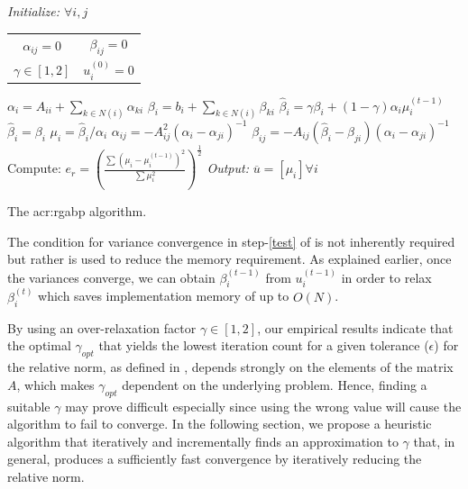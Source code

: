 \begin{algorithm}[h]
	\centering
	\begin{algorithmic}[1]
		\STATE \textit{Initialize: $\forall i,j$}\\
		\begin{tabular}{cc}
			$\alpha_{ij} = 0$ & $ \beta_{ij} = 0$\\ 
			$\gamma \in [1,2]$ & $u_i^{(0)} = 0$
		\end{tabular}
		\REPEAT[Start \gls{acr:pwgabp} iteration: $t=1,2,\cdots$]
		\STATE $\alpha_{i} = A_{ii} + \sum_{k \in N(i)} \alpha_{ki}$
		\STATE $\beta_{i} = b_{i} + \sum_{k \in N(i)} \beta_{ki}$
		\label{test}
		\STATE $\hat\beta_i = \gamma\beta_i + (1-\gamma)\alpha_i \mu_i^{(t-1)}$  
		\ELSE
		\STATE $\hat\beta_i = \beta_i$ 
		\AlgENDIF
		\STATE $\mu_i = \hat{\beta}_i / \alpha_i$
		\STATE {}
		\STATE $\alpha_{ij} = -A_{ij}^2 (\alpha_{i}-\alpha_{ji})^{-1} $
		\STATE $\beta_{ij} = -A_{ij} ( \hat\beta_{i}-\beta_{ji})(\alpha_{i}-\alpha_{ji})^{-1} $
		\AlgENDFOR
		\AlgENDFOR
		\STATE Compute:  $e_r = \left(\frac{\sum (\mu_i - \mu_i^{(t-1)})^2} {\sum \mu_i^2} \right)^{\frac{1}{2}}$
		\STATE \textit{Output:} $\overline{u} = \left[ \mu_i \right] \forall i$
	\end{algorithmic}
	\caption{The \acrshort{acr:rgabp} algorithm.}
	\label{alg:relaxed_gabp}
\end{algorithm}

The condition for variance convergence in step-\ref{test} of  is not inherently required but rather is used to reduce the memory requirement.
As explained earlier, once the variances converge, we can obtain $ \beta_i^{(t-1)}$ from $u_i^{(t-1)}$ in order to relax $\beta_i^{(t)}$ which saves implementation memory of up to $O \left( N \right)$.  

By using an over-relaxation factor $\gamma \in [1,2]$, our empirical results indicate that the optimal $\gamma_\mathit{opt}$ that yields the lowest iteration count for a given tolerance ($\epsilon$) for the relative norm, as defined in , depends strongly on the elements of the matrix $A$, which makes $\gamma_\mathit{opt}$ dependent on the underlying problem.
Hence, finding a suitable $\gamma$ may prove difficult especially since using the wrong value will cause the algorithm to fail to converge.
In the following section, we propose a heuristic algorithm that iteratively and incrementally finds an approximation to $\gamma$ that, in general, produces a sufficiently fast convergence by iteratively reducing the relative norm.


